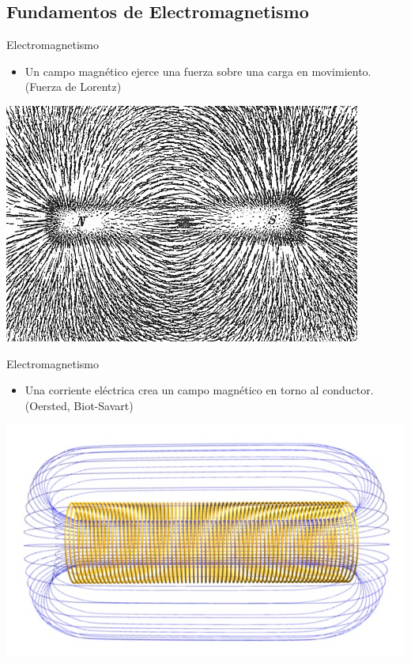 \documentclass[xcolor={usenames,svgnames,dvipsnames}]{beamer}
\begin{document}
\subsection{Fundamentos de Electromagnetismo}
\label{sec:orgef07472}
\begin{frame}[label={sec:org332ba23}]{Electromagnetismo}
\begin{itemize}
\item Un campo magnético ejerce una fuerza sobre una carga en movimiento.
(Fuerza de Lorentz)
\end{itemize}

\begin{center}
\includegraphics[width=.9\linewidth]{../figs/Magnet0873.png}
\end{center}
\end{frame}

\begin{frame}[label={sec:orgc354619}]{Electromagnetismo}
\begin{itemize}
\item Una corriente eléctrica crea un campo magnético en torno al
conductor. (Oersted, Biot-Savart)
\end{itemize}

\begin{center}
\includegraphics[width=.9\linewidth]{../figs/Solenoide.jpg}
\end{center}
\end{frame}
\end{document}
